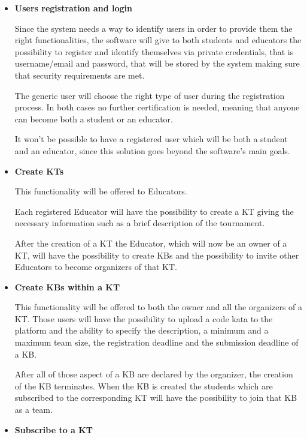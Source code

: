 \documentclass[11pt]{report}
\begin{document}
\begin{itemize}

    \item \textbf{Users registration and login}
    
    Since the system needs a way to identify users in order to provide them the right functionalities,
    the software will give to both students and educators the possibility to register and identify 
    themselves via private credentials, that is username/email and password, that will be stored 
    by the system making sure that security requirements are met.

    The generic user will choose the right type of user during the registration process.
    In both cases no further certification is needed, meaning that anyone can become both a student or an educator.

    It won't be possible to have a registered user which will be both a student and an educator, since 
    this solution goes beyond the software's main goals.

    \item \textbf{Create KTs}

    This functionality will be offered to Educators. 

    Each registered Educator will have the possibility to create a KT giving the necessary
    information such as a brief description of the tournament.

    After the creation of a KT the Educator, which will now be an owner of a KT, will
    have the possibility to create KBs and the possibility to invite other Educators to become 
    organizers of that KT\@.

    \item \textbf{Create KBs within a KT}
    
    This functionality will be offered to both the owner and all the organizers of a KT\@.
    Those users will have the possibility to upload a code kata to the platform and the ability to specify the description,
    a minimum and a maximum team size, the registration deadline and the submission deadline of a KB\@.

    After all of those aspect of a KB are declared by the organizer, the creation of the KB terminates.
    When the KB is created the students which are subscribed to the corresponding KT will have the
    possibility to join that KB as a team.

    \item \textbf{Subscribe to a KT}


\end{itemize}
\end{document}
